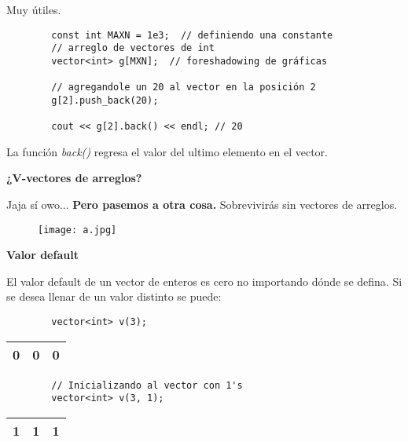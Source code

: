\documentclass[10pt]{beamer}
\begin{document}
\begin{frame}{}
    Muy útiles.
    
    \begin{verbatim}
        const int MAXN = 1e3;  // definiendo una constante
        // arreglo de vectores de int
        vector<int> g[MXN];  // foreshadowing de gráficas
        
        // agregandole un 20 al vector en la posición 2
        g[2].push_back(20);
        
        cout << g[2].back() << endl; // 20
    \end{verbatim}
    
    La función \textit{back()} regresa el valor del ultimo elemento en el vector.
  \framebreak
  
  \textbf{¿V-vectores de arreglos?}
  
  Jaja sí owo... \textbf{Pero pasemos a otra cosa.} Sobrevivirás sin vectores de arreglos.
  
      \begin{figure}
          \centering
          \texttt{[image: a.jpg]}
      \end{figure}
  
  \framebreak

  \textbf{Valor default}
  
  El valor default de un vector de enteros es cero no importando dónde se defina.
  Si se desea llenar de un valor distinto se puede:
  
    \begin{verbatim}
        vector<int> v(3);
    \end{verbatim}
        
    \begin{center}
    \begin{tabular}{ |c|c|c| } 
      \hline
      0 & 0 & 0  \\
      \hline
    \end{tabular}
  \end{center}
    
    \begin{verbatim}
        // Inicializando al vector con 1's
        vector<int> v(3, 1);
    \end{verbatim}
    
    \begin{center}
    \begin{tabular}{ |c|c|c| } 
      \hline
      1 & 1 & 1  \\
      \hline
    \end{tabular}
  \end{center}
  

\end{frame}
\end{document}
